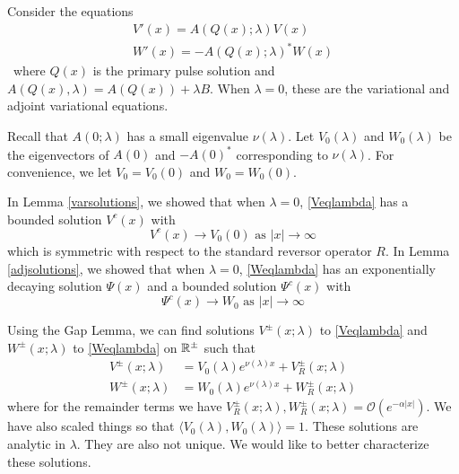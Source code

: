 \documentclass[thesis.tex]{subfiles}
\begin{document}
Consider the equations
\begin{align}
V'(x) = A(Q(x); \lambda) V(x) \label{Veqlambda} \\
W'(x) = -A(Q(x); \lambda)^* W(x) \label{Weqlambda}
\end{align}\
where $Q(x)$ is the primary pulse solution and $A(Q(x), \lambda) = A(Q(x)) + \lambda B$. When $\lambda = 0$, these are the variational and adjoint variational equations.

Recall that $A(0; \lambda)$ has a small eigenvalue $\nu(\lambda)$. Let $V_0(\lambda)$ and $W_0(\lambda)$ be the eigenvectors of $A(0)$ and $-A(0)^*$ corresponding to $\nu(\lambda)$. For convenience, we let $V_0 = V_0(0)$ and $W_0 = W_0(0)$.

In Lemma \ref{varsolutions}, we showed that when $\lambda = 0$, \eqref{Veqlambda} has a bounded solution $V^c(x)$ with
\[
V^c(x) \rightarrow V_0(0) \text{ as }|x| \rightarrow \infty
\]
which is symmetric with respect to the standard reversor operator $R$. In Lemma \ref{adjsolutions}, we showed that when $\lambda = 0$, \eqref{Weqlambda} has an exponentially decaying solution $\Psi(x)$ and a bounded solution $\Psi^c(x)$ with 
\[
\Psi^c(x) \rightarrow W_0 \text{ as }|x| \rightarrow \infty
\]

Using the Gap Lemma, we can find solutions $V^\pm(x; \lambda)$ to \eqref{Veqlambda} and $W^\pm(x; \lambda)$ to \eqref{Weqlambda} on ${\mathbb R}^\pm$ such that
\begin{align}
V^\pm(x; \lambda) &= V_0(\lambda)e^{\nu(\lambda)x} + V_R^\pm(x; \lambda) \label{Vpm} \\
W^\pm(x; \lambda) &= W_0(\lambda)e^{\nu(\lambda)x} + W_R^\pm(x; \lambda) \label{Vpm}
\end{align}
where for the remainder terms we have $V_R^\pm(x; \lambda), W_R^\pm(x; \lambda) = \mathcal{O}(e^{-\alpha |x|})$. We have also scaled things so that $\langle V_0(\lambda), W_0(\lambda) \rangle = 1$. These solutions are analytic in $\lambda$. They are also not unique. We would like to better characterize these solutions. 
\end{document}
